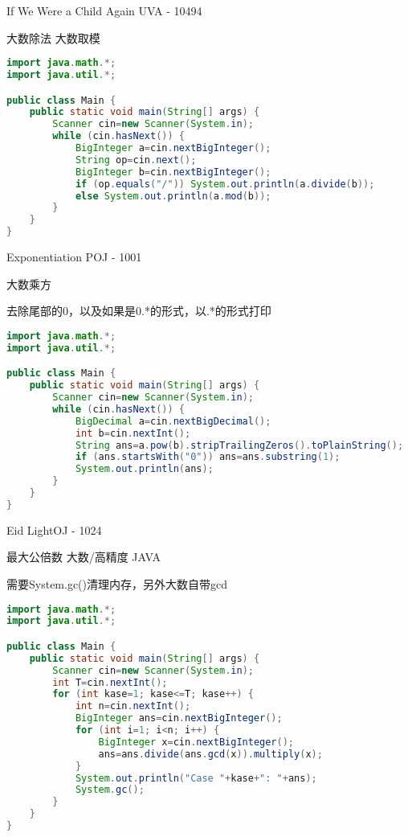 If We Were a Child Again UVA - 10494

大数除法 大数取模

\begin{lstlisting}[language={java}]
import java.math.*;
import java.util.*;

public class Main {
    public static void main(String[] args) {
        Scanner cin=new Scanner(System.in);
        while (cin.hasNext()) {
            BigInteger a=cin.nextBigInteger();
            String op=cin.next();
            BigInteger b=cin.nextBigInteger();
            if (op.equals("/")) System.out.println(a.divide(b));
            else System.out.println(a.mod(b));
        }
    }
}
\end{lstlisting}

Exponentiation POJ - 1001

大数乘方

去除尾部的0，以及如果是0.*的形式，以.*的形式打印

\begin{lstlisting}[language={java}]
import java.math.*;
import java.util.*;

public class Main {
    public static void main(String[] args) {
        Scanner cin=new Scanner(System.in);
        while (cin.hasNext()) {
            BigDecimal a=cin.nextBigDecimal();
            int b=cin.nextInt();
            String ans=a.pow(b).stripTrailingZeros().toPlainString();
            if (ans.startsWith("0")) ans=ans.substring(1);
            System.out.println(ans);
        }
    }
}
\end{lstlisting}

Eid LightOJ - 1024

最大公倍数 大数/高精度 JAVA

需要System.gc()清理内存，另外大数自带gcd

\begin{lstlisting}[language={java}]
import java.math.*;
import java.util.*;

public class Main {
    public static void main(String[] args) {
        Scanner cin=new Scanner(System.in);
        int T=cin.nextInt();
        for (int kase=1; kase<=T; kase++) {
            int n=cin.nextInt();
            BigInteger ans=cin.nextBigInteger();
            for (int i=1; i<n; i++) {
                BigInteger x=cin.nextBigInteger();
                ans=ans.divide(ans.gcd(x)).multiply(x);
            }
            System.out.println("Case "+kase+": "+ans);
            System.gc();
        }
    }
}
\end{lstlisting}

